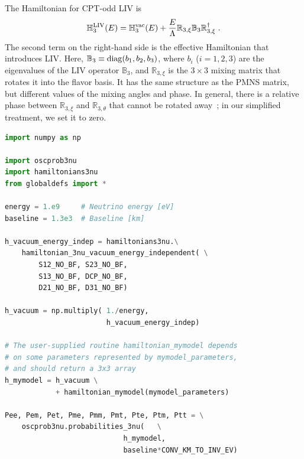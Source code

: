 \documentclass[final,5p,times,twocolumn]{elsarticle}
\begin{document}
The Hamiltonian for CPT-odd LIV is\ \cite{Coleman:1998ti, Kostelecky:2003xn, Dighe:2008bu}
\begin{equation}
 \label{equ:h3_liv}
 \mathbb{H}_3^{\rm LIV}(E)
 = 
 \mathbb{H}_3^{\rm vac}(E)
 + 
 \frac{E}{\Lambda} \mathbb{R}_{3,\xi} \mathbb{B}_3 \mathbb{R}_{3,\xi}^\dagger \;.
\end{equation}
The second term on the right-hand side is the effective Hamiltonian that introduces LIV.  Here, $\mathbb{B}_3 \equiv {\rm diag}(b_1, b_2, b_3)$, where $b_i$ ($i=1,2,3$) are the eigenvalues of the LIV operator $\mathbb{B}_3$, and $\mathbb{R}_{3,\xi}$ is the $3 \times 3$ mixing matrix that rotates it into the flavor basis.  It has the same structure as the PMNS matrix, but different values of the mixing angles and phase.  In general, there is a relative phase between $\mathbb{R}_{3,\xi}$ and $\mathbb{R}_{3,\theta}$ that cannot be rotated away\ \cite{GonzalezGarcia:2004wg, GonzalezGarcia:2005xw}; in our simplified treatment, we set it to zero.

\begin{lstlisting}[language=Python, caption={Template to use {\tt NuOscProbExact} to compute probabilities for three-neutrino oscillations with an arbitrary, user-supplied Hamiltonian}, label={lst:3nu_arbitrary}, float]
import numpy as np

import oscprob3nu
import hamiltonians3nu
from globaldefs import *

energy = 1.e9     # Neutrino energy [eV]
baseline = 1.3e3  # Baseline [km]

h_vacuum_energy_indep = hamiltonians3nu.\
    hamiltonian_3nu_vacuum_energy_independent( \
        S12_NO_BF, S23_NO_BF,
        S13_NO_BF, DCP_NO_BF,
        D21_NO_BF, D31_NO_BF)
        
h_vacuum = np.multiply( 1./energy, 
                        h_vacuum_energy_indep)

# The user-supplied routine hamiltonian_mymodel depends
# on some parameters represented by mymodel_parameters,
# and should return a 3x3 array
h_mymodel = h_vacuum \
            + hamiltonian_mymodel(mymodel_parameters)

Pee, Pem, Pet, Pme, Pmm, Pmt, Pte, Ptm, Ptt = \
    oscprob3nu.probabilities_3nu(   \
                            h_mymodel,
                            baseline*CONV_KM_TO_INV_EV)
\end{lstlisting}
\end{document}
